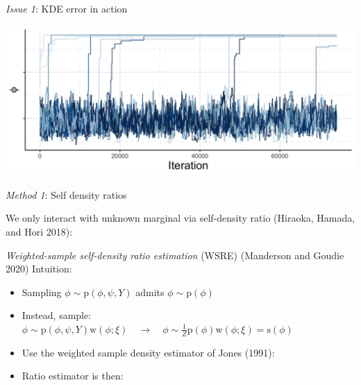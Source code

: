 \documentclass[10pt,ignorenonframetext,]{beamer}
\providecommand{\tightlist}{%
  \setlength{\itemsep}{0pt}\setlength{\parskip}{0pt}}
\newcommand{\pd}{\text{p}}
\newcommand{\w}{\text{w}}
\newcommand{\s}{\text{s}}
\begin{document}
\begin{frame}{\emph{Issue 1}: KDE error in action}



\begin{center}\includegraphics[width=1\linewidth]{figures/stage-two-trace-presentation-one} \end{center}

\end{frame}

\begin{frame}{\emph{Method 1}: Self density ratios}

We only interact with unknown marginal via self-density ratio (Hiraoka,
Hamada, and Hori 2018):


\emph{Weighted-sample self-density ratio estimation} (WSRE) (Manderson
and Goudie 2020) Intuition:

\begin{itemize}
\tightlist
\item
  Sampling \(\phi \sim \pd(\phi, \psi, Y)\) admits
  \(\phi \sim \pd(\phi)\)
\item
  Instead, sample:\\
  \(\phi \sim \pd(\phi, \psi, Y) \w(\phi; \xi) \quad \rightarrow \quad \phi \sim \frac{1}{Z}\pd(\phi)\w(\phi; \xi) = \s(\phi)\)
\item
  Use the weighted sample density estimator of Jones (1991):
  
\item
  Ratio estimator is then: \vspace{-0.35cm}\\
  
\end{itemize}

\end{frame}
\end{document}
